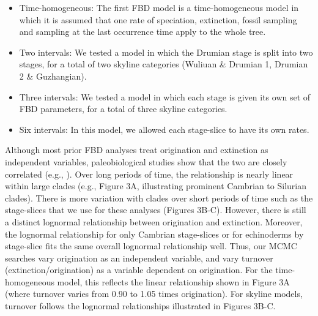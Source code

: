 \documentclass{article}
\begin{document}
\begin{itemize}
\item Time-homogeneous: The first FBD model is a time-homogeneous model in which it is assumed that one rate of speciation, extinction, fossil sampling and sampling at the last occurrence time apply to the whole tree. 
\item Two intervals: We tested a model in which the Drumian stage is split into two stages, for a total of two skyline categories (Wuliuan \& Drumian 1, Drumian 2 \& Guzhangian).
\item Three intervals: We tested a model in which each stage is given its own set of FBD parameters, for a total of three skyline categories.
\item Six intervals: In this model, we allowed each stage-slice to have its own rates.
\end{itemize}
Although most prior FBD analyses treat origination and extinction as independent variables, paleobiological studies show that the two are closely correlated (e.g., \citealp{Marshall2017}). 
Over long periods of time, the relationship is nearly linear within large clades (e.g., Figure 3A, illustrating prominent Cambrian to Silurian clades). 
There is more variation with clades over short periods of time such as the stage-slices that we use for these analyses (Figures 3B-C). 
However, there is still a distinct lognormal relationship between origination and extinction. Moreover, the lognormal relationship for only Cambrian stage-slices or for echinoderms by stage-slice fits the same overall lognormal relationship well.  
Thus, our MCMC searches vary origination as an independent variable, and vary turnover (extinction/origination) as a variable dependent on origination. For the time-homogeneous model, this reflects the linear relationship shown in Figure 3A (where turnover varies from 0.90 to 1.05 times origination).
For skyline models, turnover follows the lognormal relationships illustrated in Figures 3B-C.
\end{document}

